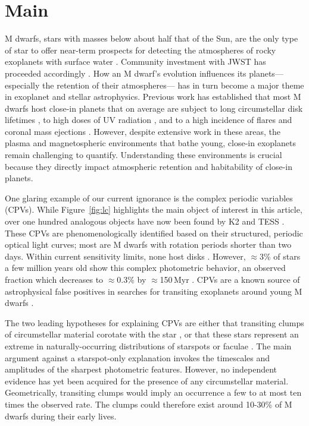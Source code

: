 \documentclass{nature3}
\begin{document}

\section{Main}
\label{sec:main}

M dwarfs, stars with masses below about half that of the Sun, are the
only type of star to offer near-term prospects for detecting the
atmospheres of rocky exoplanets with surface water \cite{NAP26141}.
Community investment with JWST has proceeded accordingly
\cite{Redfield2024,TRAPPIST1JWSTCommunityInitiative2024}.  How an M
dwarf's evolution influences its planets---especially the retention of
their atmospheres--- has in turn become a major theme in exoplanet and
stellar astrophysics.  Previous work has established that most M
dwarfs host close-in planets \cite{Dressing2015} that on average are
subject to long circumstellar disk lifetimes \cite{Ribas2015}, to high
doses of UV radiation \cite{France2016}, and to a high incidence of
flares and coronal mass ejections \cite{Gunther2020}.  However,
despite extensive work in these areas, the plasma and magnetospheric
environments that bathe young, close-in exoplanets remain challenging
to quantify.  Understanding these environments is crucial because they
directly impact atmospheric retention and habitability of close-in
planets.

One glaring example of our current ignorance is the complex periodic
variables (CPVs).  While Figure~\ref{fig:lc} highlights the main
object of interest in this article, over one hundred analogous objects
have now been found by K2 and TESS
\cite{Rebull2016,Stauffer2017,Rebull2018,Zhan2019,Rebull2020,Bouma2024}.
These CPVs are phenomenologically identified based on their
structured, periodic optical light curves; most are M dwarfs with
rotation periods shorter than two days.  Within current sensitivity
limits, none host disks \cite{Stauffer2017,Bouma2024}.  However,
$\approx$3\% of stars a few million years old show this complex
photometric behavior, an observed fraction which decreases to
$\approx$0.3\% by $\approx$150\,Myr \cite{Rebull2020}.  CPVs are a
known source of astrophysical false positives in searches for
transiting exoplanets around young M dwarfs
\cite{vanEyken2012,Johns-Krull2016,Bouma2020}.

The two leading hypotheses for explaining CPVs are either that
transiting clumps of circumstellar material corotate with the star
\cite{Stauffer2017,Gunther2022,Bouma2024}, or that these stars
represent an extreme in naturally-occurring distributions of starspots
or faculae \cite{Koen2021}.  The main argument against a starspot-only
explanation invokes the timescales and amplitudes of the sharpest
photometric features.  However, no independent evidence has yet been
acquired for the presence of any circumstellar material.
Geometrically, transiting clumps would imply an occurrence a few to at
most ten times the observed rate.  The clumps could therefore exist
around 10-30\% of M dwarfs during their early lives.
\end{document}
